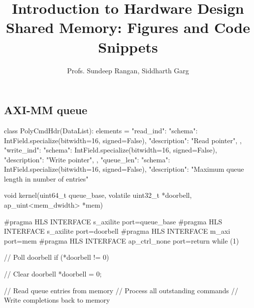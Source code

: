 \documentclass[11pt]{article}
\begin{document}
\title{Introduction to Hardware Design\\
Shared Memory:  Figures and Code Snippets}
\author{Profs. Sundeep Rangan, Siddharth Garg}
\date{}

\maketitle
\subsection{AXI-MM queue}

\begin{pythoncode}
class PolyCmdHdr(DataList):
    elements = {
        "read_ind": {
            "schema": IntField.specialize(bitwidth=16, signed=False),
            "description": "Read pointer",
        },
        "write_ind": {
            "schema": IntField.specialize(bitwidth=16, signed=False),
            "description": "Write pointer",
        },
        "queue_len": {
            "schema": IntField.specialize(bitwidth=16, signed=False),
            "description": "Maximum queue length in number of entries"
        }
    }
\end{pythoncode}

\begin{ccode}
void kernel(uint64_t queue_base,
            volatile uint32_t *doorbell,
            ap_uint<mem_dwidth> *mem) {
#pragma HLS INTERFACE s_axilite port=queue_base
#pragma HLS INTERFACE s_axilite port=doorbell
#pragma HLS INTERFACE m_axi     port=mem
#pragma HLS INTERFACE ap_ctrl_none port=return
    while (1) {
        // Poll doorbell
        if (*doorbell != 0) {

            // Clear doorbell
            *doorbell = 0;

            // Read queue entries from memory
            // Process all outstanding commands
            // Write completions back to memory
        }
    }
}

\end{ccode}
\end{document}
